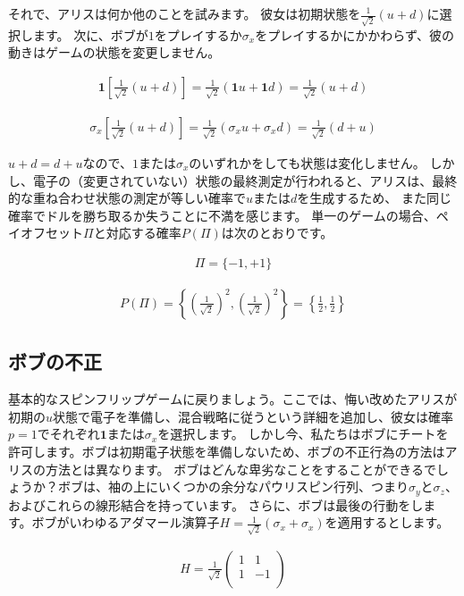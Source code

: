 それで、アリスは何か他のことを試みます。 彼女は初期状態を$\frac{1}{\sqrt{2}}(u + d)$に選択します。
次に、ボブが$1$をプレイするか$\sigma_x$をプレイするかにかかわらず、彼の動きはゲームの状態を変更しません。

\begin{align}
\textbf{1} \left[\frac{1}{\sqrt{2}}(u + d)\right]
= \frac{1}{\sqrt{2}}(\textbf{1}u + \textbf{1}d)
= \frac{1}{\sqrt{2}}(u + d) \label{eq:alice_cheat1}
\end{align}

\begin{align}
\sigma_x \left[ \frac{1}{\sqrt{2}}(u + d)\right]
= \frac{1}{\sqrt{2}}(\sigma_x u + \sigma_x d)
= \frac{1}{\sqrt{2}}(d + u)
\end{align}

$u + d = d + u$なので、$1$または$\sigma_x$のいずれかをしても状態は変化しません。
しかし、電子の（変更されていない）状態の最終測定が行われると、アリスは、最終的な重ね合わせ状態の測定が等しい確率で$u$または$d$を生成するため、
また同じ確率でドルを勝ち取るか失うことに不満を感じます。
単一のゲームの場合、ペイオフセット$\Pi$と対応する確率$P(\Pi)$は次のとおりです。

\begin{align}
\Pi = \{-1, +1\}
\end{align}

\begin{align}
P(\Pi) = \left\{ \left( \frac{1}{\sqrt{2}} \right)^2, \left( \frac{1}{\sqrt{2}} \right)^2 \right\} 
= \left\{ \frac{1}{2}, \frac{1}{2} \right\} \label{eq:alice_cheat2}
\end{align}

\subsection{ボブの不正}

基本的なスピンフリップゲームに戻りましょう。ここでは、悔い改めたアリスが初期の$u$状態で電子を準備し、混合戦略に従うという詳細を追加し、彼女は確率$p = 1$でそれぞれ$\textbf{1}$または$\sigma_x$を選択します。
しかし今、私たちはボブにチートを許可します。ボブは初期電子状態を準備しないため、ボブの不正行為の方法はアリスの方法とは異なります。
ボブはどんな卑劣なことをすることができるでしょうか？ボブは、袖の上にいくつかの余分なパウリスピン行列、つまり$\sigma_y$と$\sigma_z$、およびこれらの線形結合を持っています。
さらに、ボブは最後の行動をします。ボブがいわゆるアダマール演算子$H = \frac{1}{\sqrt{2}}(\sigma_x + \sigma_x)$を適用するとします。

\begin{align}
H = \frac{1}{\sqrt{2}}
\begin{pmatrix}
1 & 1 \\
1 & -1 \\
\end{pmatrix}
\end{align}

